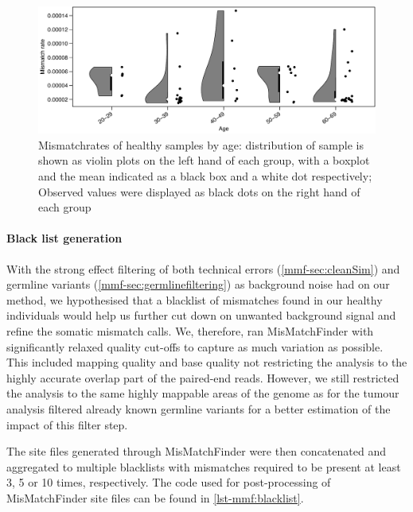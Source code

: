 \begin{figure}[ht]
\centering
\includegraphics[width=.99\linewidth]{Figures/MisMatchFinder/MisMatchRateByAge.pdf}
\caption[Mismatchrates of healthy samples by age]{Mismatchrates of healthy samples by age: distribution of sample is shown as violin plots on the left hand of each group, with a boxplot and the mean indicated as a black box and a white dot respectively; Observed values were displayed as black dots on the right hand of each group}\label{fig:mmf-mmrByAge}
\end{figure}


\paragraph{Black list generation}
\label{mmf-sec:healthyBlacklist}
With the strong effect filtering of both technical errors (\autoref{mmf-sec:cleanSim}) and germline variants (\autoref{mmf-sec:germlinefiltering}) as background noise had on our method, we hypothesised that a blacklist of mismatches found in our healthy individuals would help us further cut down on unwanted background signal and refine the somatic mismatch calls. We, therefore, ran MisMatchFinder with significantly relaxed quality cut-offs to capture as much variation as possible. This included  mapping quality and base quality  not restricting the analysis to the highly accurate overlap part of the paired-end reads. However, we still restricted the analysis to the same highly mappable areas of the genome  as for the tumour analysis  filtered already known germline variants for a better estimation of the impact of this filter step.

The site files generated through MisMatchFinder were then concatenated and aggregated to multiple blacklists with mismatches required to be present at least 3, 5 or 10 times, respectively. The code used for post-processing of MisMatchFinder site files can be found in \autoref{lst-mmf:blacklist}.


